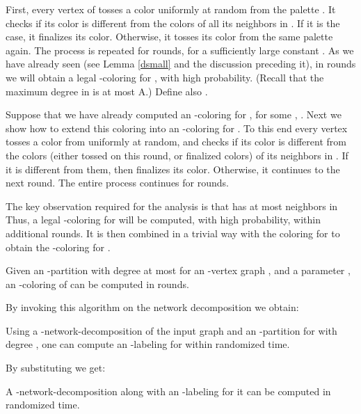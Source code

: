 \documentclass[11pt]{article}
\begin{document}
First, every vertex  of  tosses a color  uniformly at random from the palette . It checks if its color is different from the colors of all its neighbors in . If it is the case, it finalizes its color. Otherwise, it tosses its color from the same palette again. The process is repeated for  rounds, for a sufficiently large constant . As we have already seen (see Lemma \ref{dsmall} and the discussion preceding it), in  rounds we will obtain a legal -coloring  for , with high probability. (Recall that the maximum degree in  is at most A.) Define also . 

Suppose that we have already computed an -coloring  for , for some , . Next we show how to extend this coloring into an -coloring  for . To this end every vertex  tosses a color from  uniformly at random, and checks if its color is different from the colors (either tossed on this round, or finalized colors) of its neighbors in . If it is different from them, then  finalizes its color. Otherwise, it continues to the next round. The entire process continues for  rounds.

The key observation required for the analysis is that  has at most  neighbors in  Thus, a legal -coloring  for  will be computed, with high probability, within additional  rounds. It is then combined in a trivial way with the coloring  for  to obtain the -coloring  for .
\begin{thm} \label{arbc}
Given an -partition  with degree at most  for an -vertex graph , and a parameter , an -coloring of  can be computed in  rounds.
\end{thm}
By invoking this algorithm on the network decomposition  we obtain:
\begin{col}
Using a -network-decomposition  of the input graph  and an -partition  for  with degree , one can compute an -labeling for  within  randomized time.
\end{col}
By substituting  we get:
\begin{col} \label{improvement}
A -network-decomposition  along with an -labeling for it can be computed in  randomized time.
\end{col}
\end{document}
